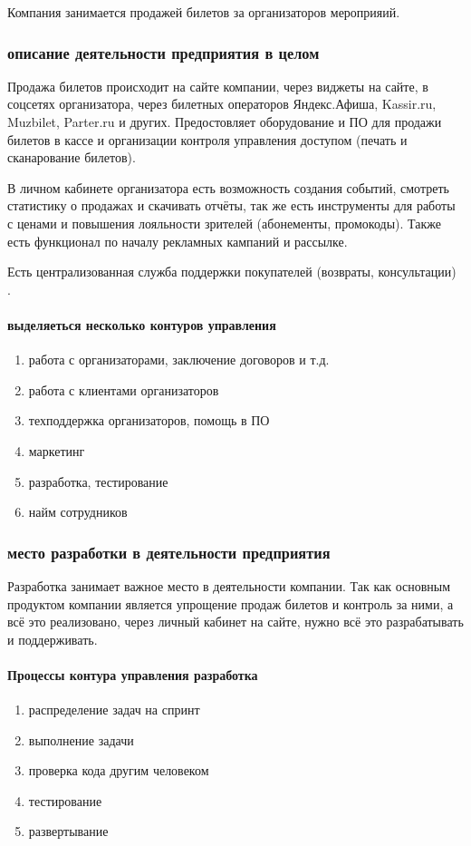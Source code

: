 \documentclass{article}
\begin{document}
Компания занимается продажей билетов за организаторов мероприяий.


\subsubsection{описание деятельности предприятия в целом}
Продажа билетов происходит на сайте компании, через виджеты на сайте, в соцсетях организатора,
через билетных операторов Яндекс.Афиша, Kassir.ru, Muzbilet, Parter.ru и других.
Предостовляет оборудование и ПО для продажи билетов в кассе
и организации контроля управления доступом (печать и сканарование билетов).

В личном кабинете организатора есть возможность создания событий,
смотреть статистику о продажах и скачивать отчёты, так же есть
инструменты для работы с ценами и повышения лояльности зрителей (абонементы, промокоды).
Также есть функционал по началу рекламных кампаний и рассылке.

Есть централизованная служба поддержки покупателей (возвраты, консультации) \cite{radario}.

\paragraph{выделяеться несколько контуров управления}
\begin{enumerate}
    \item{работа с организаторами, заключение договоров и т.д.}
    \item{работа с клиентами организаторов}
    \item{техподдержка организаторов, помощь в ПО}
    \item{маркетинг}
    \item{разработка, тестирование}
    \item{найм сотрудников}
\end{enumerate}

\subsubsection{место разработки в деятельности предприятия}

Разработка занимает важное место в деятельности компании.
Так как основным продуктом компании является упрощение продаж билетов и контроль
за ними, а всё это реализовано, через личный кабинет на сайте, нужно всё это разрабатывать
и поддерживать.

\paragraph{Процессы контура управления разработка \cite{wiki}}
\begin{enumerate}
    \item{распределение задач на спринт}
    \item{выполнение задачи}
    \item{проверка кода другим человеком}
    \item{тестирование}
    \item{развертывание}
\end{enumerate}
\end{document}
